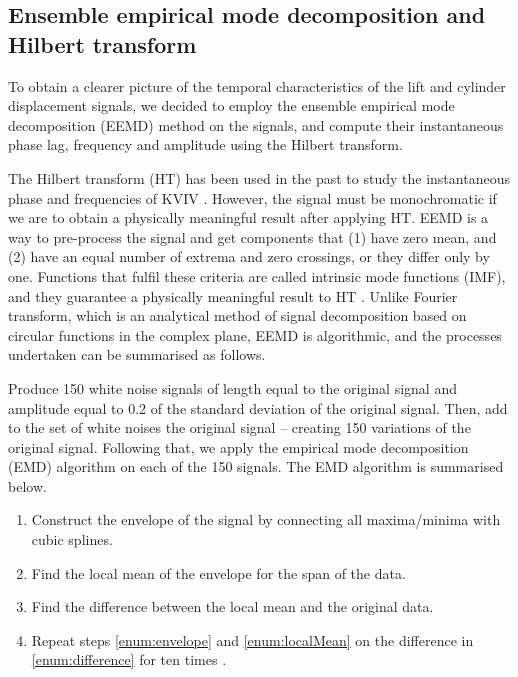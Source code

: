 \documentclass[a4paper,fleqn]{cas-sc}
\begin{document}
\subsection{Ensemble empirical mode decomposition and Hilbert transform} \label{ssec:eemd}
To obtain a clearer picture of the temporal characteristics of the lift and cylinder displacement signals, we decided to employ the ensemble empirical mode decomposition (EEMD) method \citep{Huang1998,Wu2008} on the signals, and compute their instantaneous phase lag, frequency and amplitude using the Hilbert transform.

The Hilbert transform (HT) has been used in the past to study the instantaneous phase and frequencies of KVIV \citep{Khalak1999}. However, the signal must be monochromatic if we are to obtain a physically meaningful result after applying HT. EEMD is a way to pre-process the signal and get components that (1) have zero mean, and (2) have an equal number of extrema and zero crossings, or they differ only by one. Functions that fulfil these criteria are called intrinsic mode functions (IMF), and they guarantee a physically meaningful result to HT \citep{Gumelar2019,Zhou2019}. Unlike Fourier transform, which is an analytical method of signal decomposition based on circular functions in the complex plane, EEMD is algorithmic, and the processes undertaken can be summarised as follows.

Produce 150 white noise signals of length equal to the original signal and amplitude equal to 0.2 of the standard deviation of the original signal. Then, add to the set of white noises the original signal -- creating 150 variations of the original signal. Following that, we apply the empirical mode decomposition (EMD) algorithm on each of the 150 signals. The EMD algorithm is summarised below.

\begin{enumerate} \label{enumerate:emd}
  \item Construct the envelope of the signal by connecting all maxima/minima with cubic splines. \label{enum:envelope}
  \item Find the local mean of the envelope for the span of the data. \label{enum:localMean}
  \item Find the difference between the local mean and the original data. \label{enum:difference}
  \item Repeat steps \ref{enum:envelope} and \ref{enum:localMean} on the difference in \ref{enum:difference} for ten times \citep{Wu2008}.
\end{enumerate}
\end{document}
